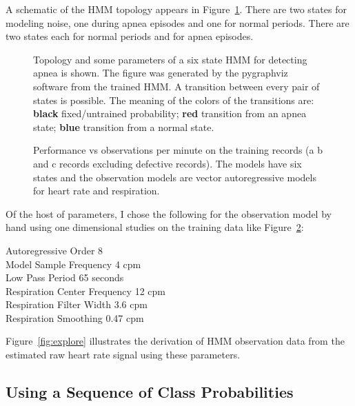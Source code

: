 A schematic of the HMM topology appears in Figure~\ref{fig:viz}.
There are two states for modeling noise, one during apnea episodes and
one for normal periods.  There are two states each for normal periods
and for apnea episodes.

\begin{figure}
  \caption[Topology of HMM for detecting apnea.]{Topology and some
    parameters of a six state HMM for detecting apnea is shown.  The
    figure was generated by the pygraphviz software from the trained
    HMM.  A transition between every pair of states is possible.  The
    meaning of the colors of the transitions are: \textbf{black}
    fixed/untrained probability; \textbf{red} transition from an apnea
    state; \textbf{blue} transition from a normal state.}
  \label{fig:viz}
\end{figure}

\begin{figure}
  \caption[Error rate as a function of sample frequency.]{Performance
    vs observations per minute on the training records (a b and c
    records excluding defective records). The models have six states
    and the observation models are vector autoregressive models for
    heart rate and respiration.}
  \label{fig:errors_vs_fs}
\end{figure}

Of the host of parameters, I chose the following for the observation
model by hand using one dimensional studies on the training data like
Figure~\ref{fig:errors_vs_fs}:
\begin{description}
\item[Autoregressive Order 8]
\item[Model Sample Frequency 4 cpm]
\item[Low Pass Period 65 seconds]
\item[Respiration Center Frequency 12 cpm]
\item[Respiration Filter Width 3.6 cpm]
\item[Respiration Smoothing 0.47 cpm]
\end{description}
Figure~\ref{fig:explore} illustrates the derivation of HMM observation
data from the estimated raw heart rate signal using these parameters.

\subsection{Using a Sequence of Class Probabilities}
\label{sec:prettygood}

